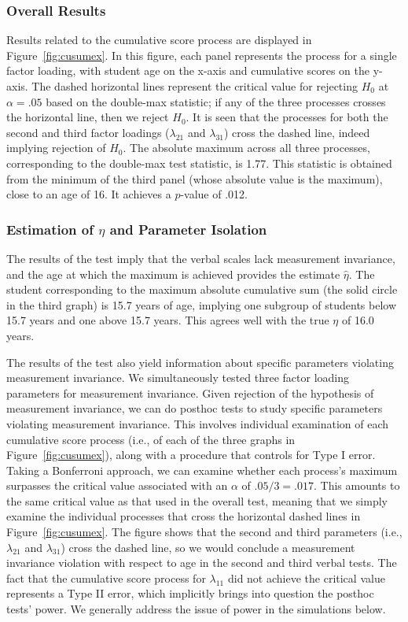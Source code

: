 \documentclass[man]{apa}
\begin{document}
\subsubsection{Overall Results}
Results related to the cumulative score process are displayed in
Figure~\ref{fig:cusumex}.  In this figure, each panel represents the
process for a single factor loading, with student age on the x-axis and
cumulative scores on the y-axis.  The dashed horizontal
lines represent the critical value for rejecting $H_0$ at $\alpha=.05$
based on the double-max statistic; if any of the three processes
crosses the horizontal line, then we reject $H_0$.  It is seen that
the processes for both the second and third factor loadings
($\lambda_{21}$ and $\lambda_{31}$) cross the dashed line, indeed
implying rejection of $H_0$.  The absolute maximum across all three processes,
corresponding to the double-max test statistic, is 1.77.  This
statistic is obtained from the minimum of the third
panel (whose absolute value is the maximum), close to an
age of 16.  It achieves a $p$-value of .012.



\subsubsection{Estimation of $\eta$ and Parameter Isolation}
The results of the test imply that the 
verbal scales lack measurement invariance, and the age at which the
maximum is achieved provides the estimate $\hat{\eta}$.
The student corresponding to the maximum
absolute cumulative sum (the solid circle in the third graph) is 15.7
years of age, implying one subgroup of 
students below 15.7 years and one above 15.7 years.  This agrees well
with the true $\eta$ of 16.0 years.

The results of the test also yield information about specific
parameters violating measurement invariance.  We simultaneously tested
three factor loading parameters for measurement invariance.  Given
rejection of the hypothesis of measurement invariance, we can 
do posthoc 
tests to study specific parameters violating measurement invariance.
This involves individual examination of each cumulative score process
(i.e., of each of the three graphs in Figure~\ref{fig:cusumex}),
along with a procedure that controls for Type I error.  Taking a
Bonferroni approach, we can examine whether each process's maximum
surpasses the critical value associated with an $\alpha$ of
$.05/3=.017$.  This amounts to the same critical value as that used in
the overall test, 
meaning that we simply examine the individual processes that cross
the horizontal dashed lines in Figure~\ref{fig:cusumex}.  The figure
shows that the second and third parameters (i.e., $\lambda_{21}$ and
$\lambda_{31}$) cross the dashed line, so we would conclude a measurement
invariance violation with respect to age in the second and third
verbal tests.  The fact that the cumulative score process for
$\lambda_{11}$ did not achieve the critical value represents a Type II
error, which implicitly brings into question the posthoc tests' power.  We
generally address the issue of power in the simulations below.
\end{document}
